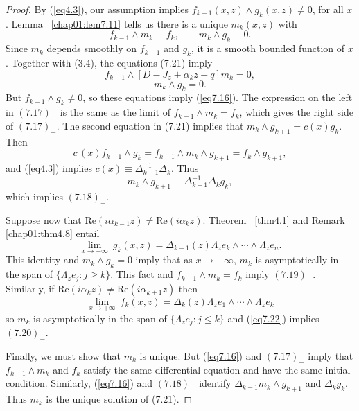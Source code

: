 \documentclass{surv-l}
\theoremstyle{plain}
\theoremstyle{definition}
\numberwithin{equation}{chapter}
\begin{document}
\begin{proof}
By (\ref{eq4.3}), our assumption implies $f_{k-1}(x, z)\wedge g_{k}(x, z)\neq 0$, for all $x$. Lemma ~\ref{chap01:lem7.11} tells us there is a unique $m_{k}(x, z)$ with
\setcounter{equation}{20}
\begin{equation}
f_{k-1}\wedge m_{k}\equiv f_{k},\qquad m_{k}\wedge g_{k}\equiv 0.
\end{equation}
Since $m_{k}$ depends smoothly on $f_{k-1}$ and $g_{k}$, it is a smooth bounded function of $x$. Together with (3.4), the equations (7.21) imply
\begin{equation*}
f_{k-1}\wedge[D-J_{z}+\alpha_{k}z-q]m_{k}=0,
\end{equation*}
\begin{equation*}
[D-J_{z}+\alpha_{k}z-q]m_{k}\wedge g_{k}=0.
\end{equation*}
But $f_{k-1}\wedge g_{k}\neq 0$, so these equations imply (\ref{eq7.16}). The expression on the left in $(7.17)_{-}$ is the same as the limit of $f_{k-1}\wedge m_{k}=f_{k}$, which gives the right side of $(7.17)_{-}$. The second equation in (7.21) implies that $m_{k}\wedge g_{k+1}=c(x)g_{k}$. Then
\begin{equation*}
c\,(x)f_{k-1}\wedge g_{k}=f_{k-1}\wedge m_{k}\wedge g_{k+1}=f_{k}\wedge g_{k+1},
\end{equation*}
and (\ref{eq4.3}) implies $c(x)\equiv\Delta_{k-1}^{-1}\Delta_{k}$. Thus
\begin{equation}\label{eq7.22}
m_{k}\wedge g_{k+1}\equiv\Delta_{k-1}^{-1}\Delta_{k}g_{k},
\end{equation}
which implies $(7.18)_{-}$.

Suppose now that $\mathrm{Re}(i\alpha_{k-1}z)\neq\mathrm{Re}(i\alpha_{k}z)$. Theorem ~\ref{thm4.1} and Remark \ref{chap01:thm4.8} entail
\begin{equation*}
\lim_{x\rightarrow-\infty}\  g_{k}(x, z)=\Delta_{k-1}(z)\Lambda_{z}e_{k}\wedge\cdots\wedge\Lambda_{z}e_{n}.
\end{equation*}
This identity and $m_{k}\wedge g_{k}=0$ imply that as $ x\rightarrow-\infty,\, m_{k}$ is asymptotically in the span of $\{\Lambda_{z}e_{j}:j\geq k\}$. This fact and $f_{k-1}\wedge m_{k}=f_{k}$ imply $(7.19)_{-}$. Similarly, if $\mathrm{Re}(i\alpha_{k}z)\neq\mathrm{Re}(i\alpha_{k+1}z)$ then
\begin{equation*}
\lim_{x\rightarrow+\infty}\  f_{k}(x, z)=\Delta_{k}(z)\Lambda_{z}e_{1}\wedge\cdots\wedge\Lambda_{z}e_{k}
\end{equation*}
so $m_{k}$ is asymptotically in the span of $\{\Lambda_{z}e_{j}:j\leq k\}$ and (\ref{eq7.22}) implies $(7.20)_{-}$.

Finally, we must show that $m_{k}$ is unique. But (\ref{eq7.16}) and $(7.17)_{-}$ imply that $f_{k-1}\wedge m_{k}$ and $f_{k}$ satisfy the same differential equation and have the same initial condition. Similarly, (\ref{eq7.16}) and $(7.18)_{-}$ identify $\Delta_{k-1}m_{k}\wedge g_{k+1}$ and $\Delta_{k}g_{k}$. Thus $m_{k}$ is the unique solution of (7.21).
\end{proof}
\end{document}
